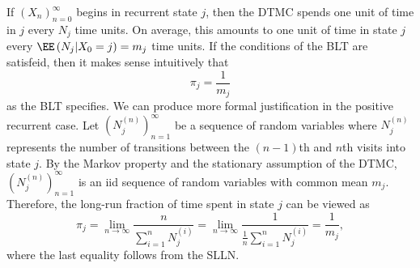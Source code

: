 \documentclass[stat333]{subfiles}
\begin{document}
    \clearpage
    \np If $\left( X_{n} \right)^{\infty}_{n=0}$ begins in recurrent state $j$, then the DTMC spends one unit of time in $j$ every $N_j$ time units. On average, this amounts to one unit of time in state $j$ every $\EE\left( N_j|X_0=j \right)=m_j$ time units. If the conditions of the BLT are satisfeid, then it makes sense intuitively that
    \begin{equation*}
        \pi_j = \frac{1}{m_j}
    \end{equation*}
    as the BLT specifies. We can produce more formal justification in the positive recurrent case. Let $\left( N_{j}^{\left( n \right)} \right)^{\infty}_{n=1}$ be a sequence of random variables where $N_j^{\left( n \right)}$ represents the number of transitions between the $\left( n-1 \right)$th and $n$th visits into state $j$. By the Markov property and the stationary assumption of the DTMC, $\left( N_{j}^{\left( n \right)} \right)^{\infty}_{n=1}$ is an iid sequence of random variables with common mean $m_j$. Therefore, the long-run fraction of time spent in state $j$ can be viewed as
    \begin{equation*}
        \pi_j = \lim_{n\to\infty} \frac{n}{\sum^{n}_{i=1}N_j^{\left( i \right)}} = \lim_{n\to\infty} \frac{1}{\frac{1}{n}\sum^{n}_{i=1}N_j^{\left( i \right)}} = \frac{1}{m_j},
    \end{equation*}
   where the last equality follows from the SLLN.

























    
    
    
    
    
    
    
    
    
    
    
    
    
    
    
    
    
\end{document}
